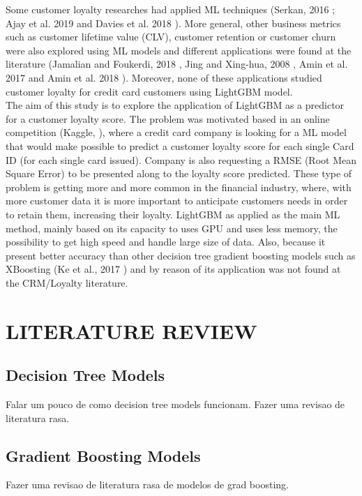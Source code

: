 \documentclass[letterpaper, 10 pt, conference]{ieeeconf}  %
\begin{document}
Some customer loyalty researches had applied ML techniques (Serkan, 2016 \cite{Loyal2016}; Ajay et al. 2019 \cite{loyal2019} and Davies et al. 2018 \cite{loyal2018}). More general, other business metrics such as customer lifetime value (CLV), customer retention or customer churn were also explored using ML models and different applications were found at the literature (Jamalian and Foukerdi, 2018 \cite{Jamalian2018}, Jing and Xing-hua, 2008 \cite{Zhao2008}, Amin et al. 2017 \cite{Amin2018} and Amin et al. 2018 \cite{Amin2018}). Moreover, none of these applications studied customer loyalty for credit card customers using LightGBM model.\\

The aim of this study is to explore the application of LightGBM as a predictor for a customer loyalty score. The problem was motivated based in an online competition (Kaggle, \cite{Kaggle}), where a credit card company is looking for a ML model that would make possible to predict a customer loyalty score for each single Card ID (for each single card issued). Company is also requesting a RMSE (Root Mean Square Error) to be presented along to the loyalty score predicted. These type of problem is getting more and more common in the financial industry, where, with more customer data it is more important to anticipate customers needs in order to retain them, increasing their loyalty. LightGBM as applied as the main ML method, mainly based on its capacity to uses GPU and uses less memory, the possibility to get high speed and handle large size of data. Also, because it present better accuracy than other decision tree gradient boosting models such as XBoosting (Ke et al., 2017 \cite{LGBM}) and by reason of its application was not found at the CRM/Loyalty literature.

\section{LITERATURE REVIEW}
\subsection{Decision Tree Models}
Falar um pouco de como decision tree models funcionam. Fazer uma revisao de literatura rasa.

\subsection{Gradient Boosting Models}
Fazer uma revisao de literatura rasa de modelos de grad boosting.
\end{document}
